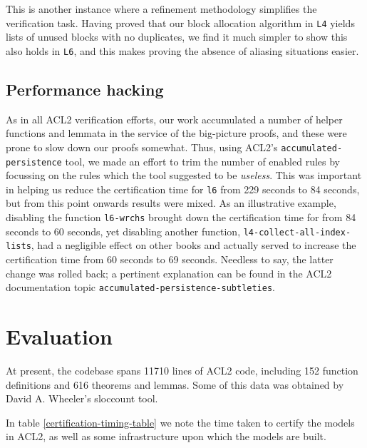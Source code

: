 \documentclass[runningheads,a4paper]{llncs}
\begin{document}
This is another instance where a refinement methodology simplifies the
verification task. Having proved that our block allocation algorithm
in \texttt{L4}
yields lists of unused blocks with no duplicates, we find it much
simpler to show this also holds in \texttt{L6}, and this makes proving
the absence of aliasing situations easier.

\subsection{Performance hacking}

As in all ACL2 verification efforts, our work accumulated a number of
helper functions and lemmata in the service of the big-picture proofs,
and these were prone to slow down our proofs somewhat. Thus, using
ACL2's \texttt{accumulated-persistence} tool, we made an effort to
trim the number of enabled rules by focussing on the rules which the
tool suggested to be \textit{useless}. This was important in helping us reduce
the certification time for \texttt{l6} from 229 seconds to 84 seconds,
but from this point onwards results were mixed. As an illustrative
example, disabling the function \texttt{l6-wrchs} brought down the
certification time for  from 84 seconds to 60 seconds, yet
disabling another function, \texttt{l4-collect-all-index-lists}, had a
negligible effect on other books and actually served to increase the
certification time from 60 seconds to 69 seconds. Needless to say, the
latter change was rolled back; a pertinent explanation can be found in
the ACL2 documentation topic \texttt{accumulated-persistence-subtleties}.


\section{Evaluation}
At present, the codebase spans 11710 lines of ACL2 code, including 152
function definitions and 616 theorems and lemmas. Some of this data was
obtained by David A. Wheeler's sloccount tool.

In table \ref{certification-timing-table} we note the time taken to certify
the models in ACL2, as well as some infrastructure upon which the
models are built.
\end{document}
